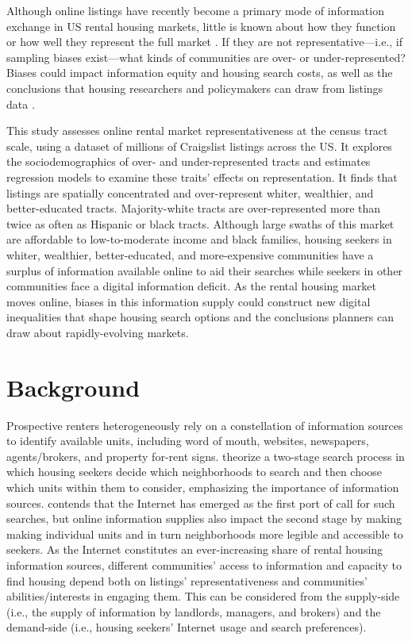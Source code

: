 \documentclass[11pt,letterpaper]{article}
\begin{document}
Although online listings have recently become a primary mode of information exchange in US rental housing markets, little is known about how they function or how well they represent the full market \citep{schachter_immigration_2017,besbris_language_2018}. If they are not representative---i.e., if sampling biases exist---what kinds of communities are over- or under-represented? Biases could impact information equity and housing search costs, as well as the conclusions that housing researchers and policymakers can draw from listings data \citep{mclaughlin_data_2017,arribas-bel_use_2018,folch_fast_2018}.

This study assesses online rental market representativeness at the census tract scale, using a dataset of millions of Craigslist listings across the US. It explores the sociodemographics of over- and under-represented tracts and estimates regression models to examine these traits' effects on representation. It finds that listings are spatially concentrated and over-represent whiter, wealthier, and better-educated tracts. Majority-white tracts are over-represented more than twice as often as Hispanic or black tracts. Although large swaths of this market are affordable to low-to-moderate income and black families, housing seekers in whiter, wealthier, better-educated, and more-expensive communities have a surplus of information available online to aid their searches while seekers in other communities face a digital information deficit. As the rental housing market moves online, biases in this information supply could construct new digital inequalities that shape housing search options and the conclusions planners can draw about rapidly-evolving markets.

\section{Background}

Prospective renters heterogeneously rely on a constellation of information sources to identify available units, including word of mouth, websites, newspapers, agents/brokers, and property for-rent signs. \citet{krysan_cycle_2017} theorize a two-stage search process in which housing seekers decide which neighborhoods to search and then choose which units within them to consider, emphasizing the importance of information sources. \citet{rae_online_2015} contends that the Internet has emerged as the first port of call for such searches, but online information supplies also impact the second stage by making making individual units and in turn neighborhoods more legible and accessible to seekers. As the Internet constitutes an ever-increasing share of rental housing information sources, different communities' access to information and capacity to find housing depend both on listings' representativeness and communities' abilities/interests in engaging them. This can be considered from the supply-side (i.e., the supply of information by landlords, managers, and brokers) and the demand-side (i.e., housing seekers' Internet usage and search preferences).
\end{document}
